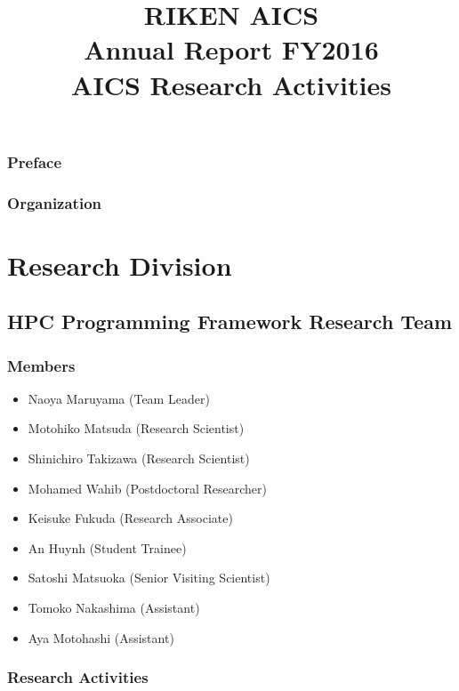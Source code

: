 \documentclass{book}
\title{RIKEN AICS\\
       Annual Report FY2016\\
      AICS Research Activities}
\author{}
\begin{document}
\maketitle

\section*{Preface}

\newpage

\section*{Organization}


\tableofcontents

\part{Research Division}

\chapter{HPC Programming Framework Research Team}

\section{Members}

\begin{itemize}
  \item[] Naoya Maruyama (Team Leader)
  \item[] Motohiko Matsuda (Research Scientist)
  \item[] Shinichiro Takizawa (Research Scientist)
  \item[] Mohamed Wahib (Postdoctoral Researcher)
  \item[] Keisuke Fukuda (Research Associate)
  \item[] An Huynh (Student Trainee)
  \item[] Satoshi Matsuoka (Senior Visiting Scientist)
  \item[] Tomoko Nakashima (Assistant)
  \item[] Aya Motohashi (Assistant)
\end{itemize}


\section{Research Activities}
\end{document}
